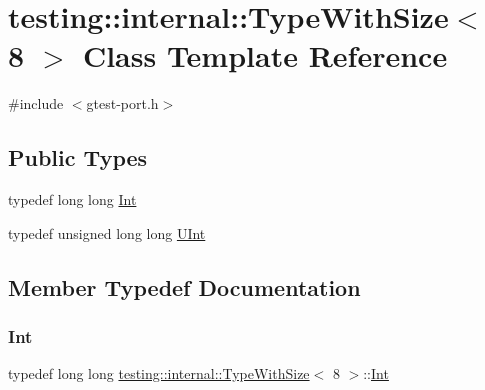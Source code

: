 \hypertarget{classtesting_1_1internal_1_1TypeWithSize_3_018_01_4}{}\section{testing\+::internal\+::Type\+With\+Size$<$ 8 $>$ Class Template Reference}
\label{classtesting_1_1internal_1_1TypeWithSize_3_018_01_4}


{\ttfamily \#include $<$gtest-\/port.\+h$>$}

\subsection*{Public Types}
\begin{DoxyCompactItemize}
\item 
typedef long long \mbox{\hyperlink{classtesting_1_1internal_1_1TypeWithSize_3_018_01_4_a36d5697e5f5254b0495f13c97d747e36}{Int}}
\item 
typedef unsigned long long \mbox{\hyperlink{classtesting_1_1internal_1_1TypeWithSize_3_018_01_4_a747e21c5aee8faf07ec65cd4c3d1ca62}{U\+Int}}
\end{DoxyCompactItemize}


\subsection{Member Typedef Documentation}
\mbox{\label{classtesting_1_1internal_1_1TypeWithSize_3_018_01_4_a36d5697e5f5254b0495f13c97d747e36}} 
\subsubsection{\texorpdfstring{Int}{Int}}
{\footnotesize\ttfamily typedef long long \mbox{\hyperlink{classtesting_1_1internal_1_1TypeWithSize}{testing\+::internal\+::\+Type\+With\+Size}}$<$ 8 $>$\+::\mbox{\hyperlink{classtesting_1_1internal_1_1TypeWithSize_3_018_01_4_a36d5697e5f5254b0495f13c97d747e36}{Int}}}

\mbox{\label{classtesting_1_1internal_1_1TypeWithSize_3_018_01_4_a747e21c5aee8faf07ec65cd4c3d1ca62}} 

